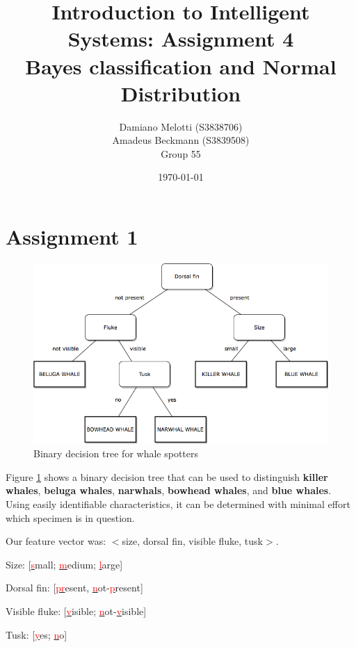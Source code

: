 \documentclass[a4paper]{article}
\title{Introduction to Intelligent Systems: Assignment 4
\\Bayes classification and Normal Distribution}
\author{Damiano Melotti (S3838706)\\Amadeus Beckmann (S3839508)\\Group 55}
\date{\today}
\begin{document}
\maketitle

\section{Assignment 1}

\begin{figure}[H]
\begin{center}
\includegraphics[width=\textwidth]{binary-decision-tree-for-whales.png}
\end{center}
\caption{Binary decision tree for whale spotters}
\label{ref:decision-tree}
\end{figure}

Figure \ref{ref:decision-tree} shows a binary decision tree that can be used to distinguish \textbf{killer whales}, \textbf{beluga whales}, \textbf{narwhals}, \textbf{bowhead whales}, and \textbf{blue whales}. Using easily identifiable characteristics, it can be determined with minimal effort which specimen is in question.

Our feature vector was: $<$size, dorsal fin, visible fluke, tusk$>$.
\begin{description}
    \item Size: [\underline{\textcolor{red}{s}}mall; \underline{\textcolor{red}{m}}edium; \underline{\textcolor{red}{l}}arge]
    \item Dorsal fin: [\underline{\textcolor{red}{pr}}esent, \underline{\textcolor{red}{n}}ot-\underline{\textcolor{red}{p}}resent]
    \item Visible fluke: [\underline{\textcolor{red}{v}}isible; \underline{\textcolor{red}{n}}ot-\underline{\textcolor{red}{v}}isible]
    \item Tusk: [\underline{\textcolor{red}{y}}es; \underline{\textcolor{red}{n}}o]
\end{description}
\end{document}

